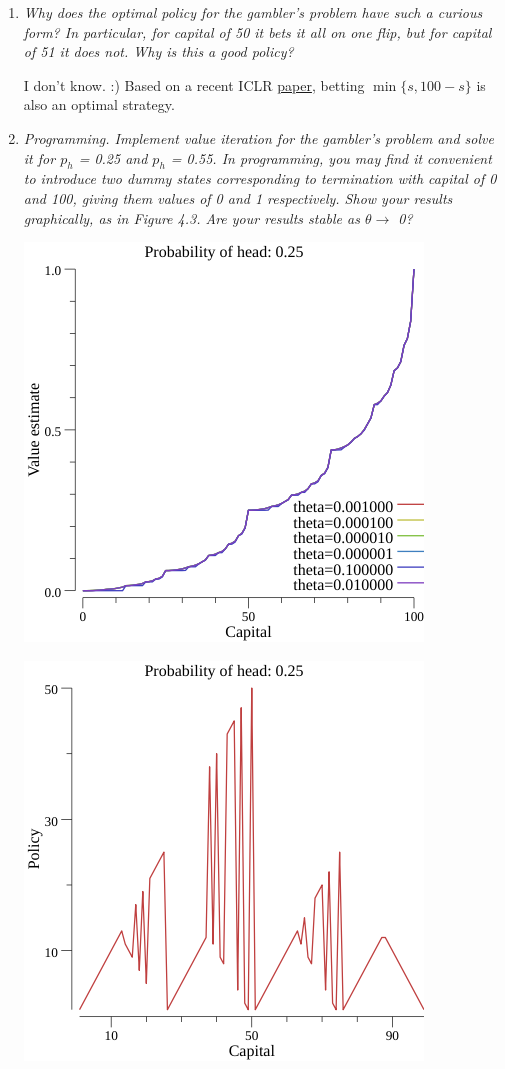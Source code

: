 \documentclass[12pt,a4paper]{article}
\begin{document}
\begin{enumerate}
  \item
    \textit{Why does the optimal policy for the gambler’s problem have such a curious form?
    In particular, for capital of 50 it bets it all on one flip, but for capital of 51 it
    does not. Why is this a good policy?}

    I don't know. :) Based on a recent ICLR \href{https://arxiv.org/pdf/2001.00102.pdf}{paper},
    betting $\min\{s, 100 -s\}$ is also an optimal strategy.

  \item
    \textit{Programming. Implement value iteration for the gambler’s problem and
    solve it for $p_h$ = 0.25 and $p_h$ = 0.55. In programming, you may find it convenient to
    introduce two dummy states corresponding to termination with capital of 0 and 100,
    giving them values of 0 and 1 respectively. Show your results graphically, as in Figure 4.3.
    Are your results stable as $\theta \rightarrow$ 0?}

    \begin{center}
      \includegraphics[scale=0.6]{gambling_value_0.25}

      \includegraphics[scale=0.6]{gambling_policy_0.25}


\end{center}
\end{enumerate}
\end{document}
